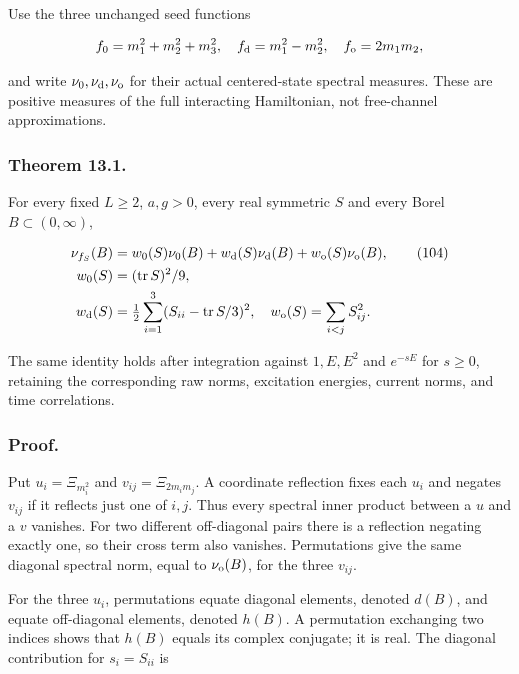 Use the three unchanged seed functions

\[
f_0=m_1^2+m_2^2+m_3^2,\quad
 f_{\rm d}=m_1^2-m_2^2,\quad f_{\rm o}=2m_1m_2,
\]

and write \(\nu_0,\nu_{\rm d},\nu_{\rm o}\) for their actual
centered-state spectral measures. These are positive measures of the
full interacting Hamiltonian, not free-channel approximations.

\subsubsection{Theorem 13.1.}\label{fabel-tensor-transfer-md-theorem-13.1.}

For every fixed \(L\ge2\), \(a,g>0\), every real symmetric \(S\) and
every Borel \(B\subset(0,\infty)\),

\[
\begin{aligned}
 \nu_{f_S}(B)&=w_0(S)\nu_0(B)+w_{\rm d}(S)\nu_{\rm d}(B)
                         +w_{\rm o}(S)\nu_{\rm o}(B),\qquad\text{(104)}\\
 w_0(S)&=(\operatorname{tr}S)^2/9,\\
 w_{\rm d}(S)&=\tfrac12\sum_{i=1}^3(S_{ii}-\operatorname{tr}S/3)^2,\quad
 w_{\rm o}(S)=\sum_{i<j}S_{ij}^2.
\end{aligned}
\]

The same identity holds after integration against \(1,E,E^2\) and
\(e^{-sE}\) for \(s\ge0\), retaining the corresponding raw norms,
excitation energies, current norms, and time correlations.

\subsubsection{Proof.}\label{fabel-tensor-transfer-md-proof.}

Put \(u_i=\Xi_{m_i^2}\) and \(v_{ij}=\Xi_{2m_im_j}\). A coordinate
reflection fixes each \(u_i\) and negates \(v_{ij}\) if it reflects just
one of \(i,j\). Thus every spectral inner product between a \(u\) and a
\(v\) vanishes. For two different off-diagonal pairs there is a
reflection negating exactly one, so their cross term also vanishes.
Permutations give the same diagonal spectral norm, equal to
\(\nu_{\rm o}(B)\), for the three \(v_{ij}\).

For the three \(u_i\), permutations equate diagonal elements, denoted
\(d(B)\), and equate off-diagonal elements, denoted \(h(B)\). A
permutation exchanging two indices shows that \(h(B)\) equals its
complex conjugate; it is real. The diagonal contribution for
\(s_i=S_{ii}\) is

